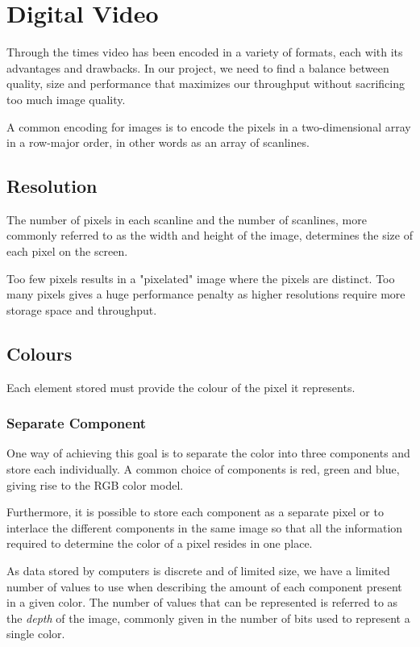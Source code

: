 \section{Digital Video}
Through the times video has been encoded in a variety of formats, each with its advantages and drawbacks.
In our project, we need to find a balance between quality, size and performance that maximizes our throughput without sacrificing too much image quality.

A common encoding for images is to encode the pixels in a two-dimensional array in a row-major order, in other words as an array of scanlines.

\subsection{Resolution}
The number of pixels in each scanline and the number of scanlines, more commonly referred to as the width and height of the image, determines the size of each pixel on the screen.

Too few pixels results in a "pixelated" image where the pixels are distinct.
Too many pixels gives a huge performance penalty as higher resolutions require more storage space and throughput.

\subsection{Colours}
Each element stored must provide the colour of the pixel it represents.

\subsubsection{Separate Component}
One way of achieving this goal is to separate the color into three components and store each individually.
A common choice of components is red, green and blue, giving rise to the RGB color model.

Furthermore, it is possible to store each component as a separate pixel or to interlace the different components in the same image so that all the information required to determine the color of a pixel resides in one place.

As data stored by computers is discrete and of limited size, we have a limited number of values to use when describing the amount of each component present in a given color.
The number of values that can be represented is referred to as the \textit{depth} of the image, commonly given in the number of bits used to represent a single color.

